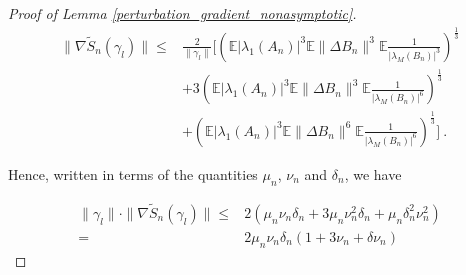 \documentclass{article} \usepackage{iclr2019_conference,times}
\newcommand{\expe}{\mathbb{E}}
\begin{document}
\begin{proof}[Proof of Lemma \ref{perturbation_gradient_nonasymptotic}]
\begin{equation}
\begin{split}
\| \nabla \tilde{S}_n(\gamma_l) \| \leq & \frac{2}{\| \gamma_l \|} \Big[\left(\expe |\lambda_1(A_n)|^3 \expe \|\Delta B_n \|^3 \expe  \frac{1}{|\lambda_M(B_n)|^3}\right)^{\frac{1}{3}} \\
&+ 3 \left(\expe |\lambda_1(A_n)|^3 \expe \|\Delta B_n \|^3 \expe  \frac{1}{|\lambda_M(B_n)|^6}\right)^{\frac{1}{3}} \\
 &+ \left(\expe |\lambda_1(A_n)|^3 \expe \|\Delta B_n \|^6 \expe  \frac{1}{|\lambda_M(B_n)|^6}\right)^{\frac{1}{3}} \Big]~.
\end{split}
\end{equation}

Hence, written in terms of the quantities $\mu_n$, $\nu_n$ and $\delta_n$, we have

\begin{equation}
\begin{split}
\| \gamma_l \| \cdot \| \nabla \tilde{S}_n(\gamma_l) \| \leq & 
2 (\mu_n \nu_n \delta_n + 3 \mu_n \nu_n^2 \delta_n + \mu_n \delta_n^2 \nu_n^2) \\
=& 2 \mu_n \nu_n \delta_n (1 + 3 \nu_n + \delta \nu_n)
\end{split}
\end{equation}



\end{proof}
\end{document}
